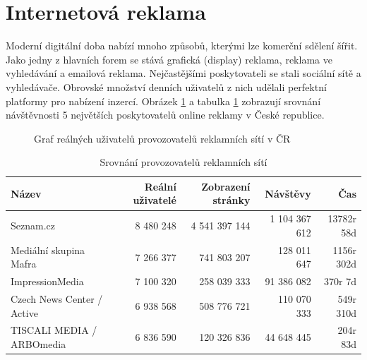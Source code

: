\section{Internetová reklama}\label{sec:online-ad}
Moderní digitální doba nabízí mnoho způsobů, kterými lze komerční sdělení šířit. Jako jedny z hlavních forem se stává grafická (display) reklama,
reklama ve vyhledávání a emailová reklama. Nejčastějšími poskytovateli se stali sociální sítě a vyhledávače.
Obrovské množství denních uživatelů z nich udělali perfektní platformy pro nabízení inzercí.
Obrázek \ref{fig:spir-publishers} a tabulka \ref{tab:spir-publishers} zobrazují srovnání návštěvnosti 5 největších poskytovatelů online reklamy v České republice.

\begin{figure}[h]
    \centering
    \caption{Graf reálných uživatelů provozovatelů reklamních sítí v ČR \cite{spir:mediatypes}}
    \label{fig:spir-publishers}
    
\end{figure}

\begin{table}[hb]
    \centering
    \caption[Srovnání provozovatelů reklamních sítí]{Srovnání provozovatelů reklamních sítí \cite{spir:mediatypes}}
	\label{tab:spir-publishers}
    \begin{tabular}{l|r|r|r|r}
        \toprule
            Název & Reální uživatelé & Zobrazení stránky & Návštěvy & Čas \\
        \midrule
            Seznam.cz & 8 480 248 & 4 541 397 144  & 1 104 367 612 & 13782r 58d  \\
            Mediální skupina Mafra & 7 266 377 & 741 803 207  & 128 011 647  & 1156r 302d \\
            ImpressionMedia & 7 100 320  & 258 039 333 & 91 386 082 & 370r 7d  \\
            Czech News Center / Active & 6 938 568 & 508 776 721 & 110 070 333  & 549r 310d  \\
            TISCALI MEDIA / ARBOmedia & 6 836 590 & 120 326 836  & 44 648 445 & 204r 83d  \\
        \midrule
        
    \end{tabular}
\end{table}


